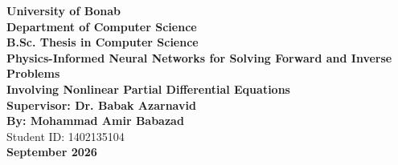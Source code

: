 \clearpage
\thispagestyle{empty}
\begin{latin}
\begin{center}
{\large\bfseries University of Bonab}\\[2mm]
{\large\bfseries Department of Computer Science}\\[8mm]
{\Large\bfseries B.Sc. Thesis in Computer Science}\\[7mm]
{\LARGE\bfseries Physics-Informed Neural Networks for Solving Forward and Inverse Problems\\[2mm]
Involving Nonlinear Partial Differential Equations}\\[12mm]
{\large\bfseries Supervisor: Dr. Babak Azarnavid}\\[6mm]
{\large\bfseries By: Mohammad Amir Babazad}\\[2mm]
{\normalsize Student ID: 1402135104}\\[10mm]
{\large\bfseries September 2026}
\end{center}
\end{latin}
\clearpage
